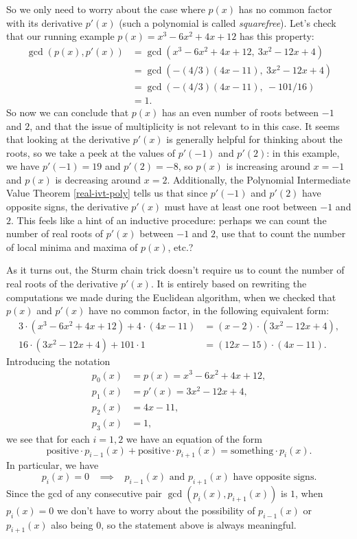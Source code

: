 So we only need to worry about the case where $p(x)$ has no common factor with its derivative $p'(x)$ (such a polynomial is called \emph{squarefree}). Let's check that our running example $p(x) = x^3 - 6x^2 + 4x + 12$ has this property:
\begin{align*}
\gcd(p(x), p'(x)) &= \gcd(x^3 - 6x^2 + 4x + 12,\ 3x^2 - 12x + 4)\\
&= \gcd(-(4/3)(4x - 11),\ 3x^2 - 12x + 4)\\
&= \gcd(-(4/3)(4x - 11),\ -101/16)\\
&= 1.
\end{align*}
So now we can conclude that $p(x)$ has an even number of roots between $-1$ and $2$, and that the issue of multiplicity is not relevant to in this case. It seems that looking at the derivative $p'(x)$ is generally helpful for thinking about the roots, so we take a peek at the values of $p'(-1)$ and $p'(2)$: in this example, we have $p'(-1) = 19$ and $p'(2) = -8$, so $p(x)$ is increasing around $x = -1$ and $p(x)$ is decreasing around $x = 2$. Additionally, the Polynomial Intermediate Value Theorem \ref{real-ivt-poly} tells us that since $p'(-1)$ and $p'(2)$ have opposite signs, the derivative $p'(x)$ must have at least one root between $-1$ and $2$. This feels like a hint of an inductive procedure: perhaps we can count the number of real roots of $p'(x)$ between $-1$ and $2$, use that to count the number of local minima and maxima of $p(x)$, etc.?

As it turns out, the Sturm chain trick doesn't require us to count the number of real roots of the derivative $p'(x)$. It is entirely based on rewriting the computations we made during the Euclidean algorithm, when we checked that $p(x)$ and $p'(x)$ have no common factor, in the following equivalent form:
\begin{align*}
3\cdot(x^3 - 6x^2 + 4x + 12) + 4\cdot(4x-11) &= (x-2)\cdot(3x^2 - 12x + 4),\\
16\cdot(3x^2 - 12x + 4) + 101\cdot 1 &= (12x-15)\cdot(4x-11).
\end{align*}
Introducing the notation
\begin{align*}
p_0(x) &= p(x) = x^3 - 6x^2 + 4x + 12,\\
p_1(x) &= p'(x) = 3x^2 - 12x + 4,\\
p_2(x) &= 4x - 11,\\
p_3(x) &= 1,
\end{align*}
we see that for each $i = 1,2$ we have an equation of the form
\[
\text{positive}\cdot p_{i-1}(x) + \text{positive}\cdot p_{i+1}(x) = \text{something}\cdot p_i(x).
\]
In particular, we have
\[
p_i(x) = 0 \;\;\; \implies \;\;\; p_{i-1}(x) \text{ and } p_{i+1}(x) \text{ have opposite signs.}
\]
Since the gcd of any consecutive pair $\gcd(p_i(x), p_{i+1}(x))$ is $1$, when $p_i(x) = 0$ we don't have to worry about the possibility of $p_{i-1}(x)$ or $p_{i+1}(x)$ also being $0$, so the statement above is always meaningful.

